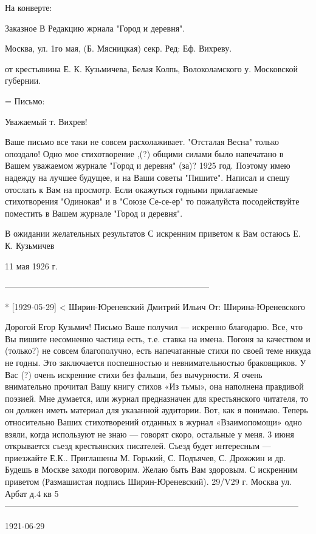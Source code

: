 На конверте:

Заказное
В Редакцию жрнала "Город и деревня".

Москва, ул. 1го мая,
(Б. Мясницкая)
секр. Ред: Еф. Вихреву.

от крестьянина Е. К. Кузьмичева,
Белая Колпь, Волоколамского у.
Московской губернии.


= Письмо:

Уважаемый т. Вихрев!

Ваше письмо все таки не совсем расхолаживает. "Отсталая Весна" только опоздало! Одно мое стихотворение ,(?) общими силами было напечатано в Вашем уважаемом журнале "Город и деревня" (за)? 1925 год. Поэтому имею надежду на лучшее будущее, и на Ваши советы "Пишите". Написал и спешу отослать к Вам на просмотр. Если окажуться годными прилагаемые стихотворения "Одинокая" и в "Союзе Се-се-ер" то пожалуйста посодействуйте поместить в Вашем журнале "Город и деревня".

В ожидании желательных результатов
С искренним приветом к Вам остаюсь
Е. К. Кузьмичев

11 мая 1926 г.

------------------------------------------------------------------------

* [1929-05-29] < Ширин-Юреневский Дмитрий Ильич
От: Ширина-Юреневского

Дорогой Егор Кузьмич!
Письмо Ваше получил — искренно благодарю.
Все, что Вы пишите несомненно частица есть, т.е. ставка на имена.  Погоня за качеством и (только?) не совсем благополучно, есть напечатанные стихи по своей теме никуда не годны. Это заключается поспешностью и невнимательностью браковщиков. У Вас (?) очень искренние стихи без фальши, без вычурности. Я очень внимательно прочитал Вашу книгу стихов «Из тьмы», она наполнена правдивой поэзией. Мне думается, или журнал предназначен для крестьянского читателя, то он должен иметь материал для указанной аудитории. Вот, как я понимаю. Теперь относительно Ваших стихотворений отданных в журнал «Взаимопомощи» одно взяли, когда используют не знаю — говорят скоро, остальные у меня. 3 июня открывается съезд крестьянских писателей. Съезд будет интересным — приезжайте Е.К.. Приглашены М. Горький, С. Подъячев, С. Дрожжин и др. Будешь в Москве заходи поговорим. Желаю быть Вам здоровым.
С искренним приветом (Размашистая подпись Ширин-Юреневский).
29/V29 г.
Москва ул. Арбат д.4 кв 5
--------------------------------------------------------------------------------------------------------

1921-06-29


